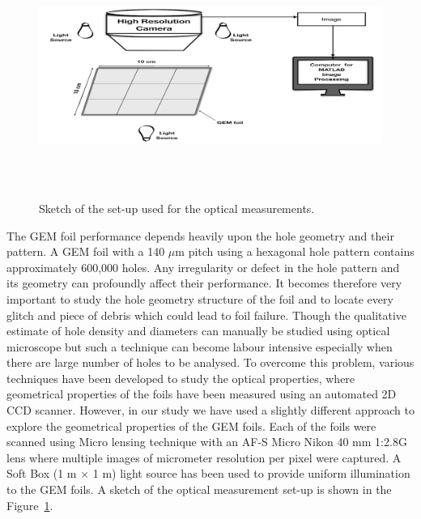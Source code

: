 \begin{figure}[!htbp]
    \centering
        \includegraphics[width=12cm, height=8cm]{figures/GEM/figures/2.jpeg}
   \caption{Sketch of the set-up used for the optical measurements.}   \label{fig:Optical_Sketch}
\end{figure}

The GEM foil performance depends heavily upon the hole geometry and their pattern. A GEM foil with a 140 $\mu$m pitch using a hexagonal hole pattern contains approximately 600,000 holes. Any irregularity or defect in the hole pattern and its geometry can profoundly affect their performance. It becomes therefore very important to study the hole geometry structure of the foil and to locate every glitch and piece of debris which could lead to foil failure. Though the qualitative estimate of hole density and diameters can  manually be studied using optical microscope but such a technique can become labour intensive especially when there are large number of holes to be analysed. To overcome this problem, various techniques have been developed \cite{Posik2015, Becker2006} to study the optical properties, where geometrical properties of the foils have been measured using an automated 2D CCD scanner. However, in our study we have used a slightly different approach to explore the geometrical properties of the GEM foils. Each of the foils were scanned using Micro lensing technique with an AF-S Micro Nikon 40 mm 1:2.8G lens where multiple images of micrometer resolution per pixel were captured. A Soft Box (1 m $\times$ 1 m) light source has been used to provide uniform illumination to the GEM foils. A sketch of the optical measurement set-up is shown in the Figure~\ref{fig:Optical_Sketch}.


